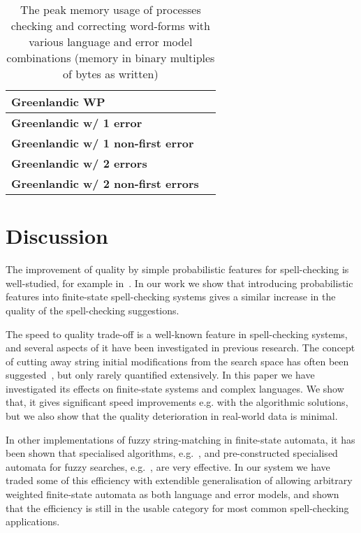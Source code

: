 \documentclass[a4paper,12pt]{article}
\begin{document}
\begin{table}
\begin{tabular}{|l|r|}
        \hline
        \bf Greenlandic WP    & \\
        \hline
        \bf Greenlandic w/ 1 error    & \\
\bf Greenlandic w/ 1 non-first error  & \\
       \bf Greenlandic w/ 2 errors    &  \\
\bf Greenlandic w/ 2 non-first errors &  \\
        \hline
    \end{tabular}
    \caption{The peak memory usage of processes checking and correcting
        word-forms with various language and error model combinations
        (memory in binary multiples of bytes as written) \label{table:memory}}
\end{table}


\section{Discussion}
\label{sec:discussion}

The improvement of quality by simple probabilistic features for spell-checking
is well-studied, for example in~\cite{church1991probability}. In our work we
show that introducing probabilistic features into finite-state spell-checking
systems gives a similar increase in the quality of the spell-checking
suggestions.

The speed to quality trade-off is a well-known feature in spell-checking
systems, and several aspects of it have been investigated in previous research.
The concept of cutting away string initial modifications from the search space
has often been suggested~\cite{kukich1992techniques}, but only rarely
quantified extensively. In this paper we have investigated its effects on
finite-state systems and complex languages. We show that, it gives significant
speed improvements e.g. with the algorithmic solutions, but we also show that
the quality deterioration in real-world data is minimal.

In other implementations of fuzzy string-matching in finite-state automata, it
has been shown that specialised algorithms, e.g.~\cite{oflazer/1996}, and
pre-constructed specialised automata for fuzzy searches,
e.g.~\cite{hulden/2009}, are very effective. In our system we have traded some
of this efficiency with extendible generalisation of allowing arbitrary
weighted finite-state automata as both language and error models, and shown
that the efficiency is still in the usable category for most common
spell-checking applications.
\end{document}
